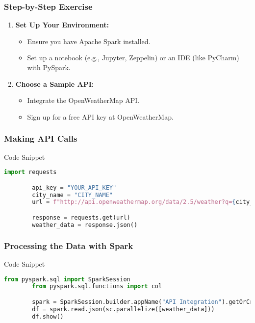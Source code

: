 \documentclass[aspectratio=169]{beamer}
\begin{document}
\begin{frame}[fragile]
    \frametitle{Step-by-Step Exercise}
    \begin{enumerate}
        \item \textbf{Set Up Your Environment:}
            \begin{itemize}
                \item Ensure you have Apache Spark installed.
                \item Set up a notebook (e.g., Jupyter, Zeppelin) or an IDE (like PyCharm) with PySpark.
            \end{itemize}
            
        \item \textbf{Choose a Sample API:}
            \begin{itemize}
                \item Integrate the OpenWeatherMap API.
                \item Sign up for a free API key at OpenWeatherMap.
            \end{itemize}
    \end{enumerate}
\end{frame}

\begin{frame}[fragile]
    \frametitle{Making API Calls}
    \begin{block}{Code Snippet}
        \begin{lstlisting}[language=Python]
        import requests

        api_key = "YOUR_API_KEY"
        city_name = "CITY_NAME"
        url = f"http://api.openweathermap.org/data/2.5/weather?q={city_name}&appid={api_key}"

        response = requests.get(url)
        weather_data = response.json()
        \end{lstlisting}
    \end{block}
\end{frame}

\begin{frame}[fragile]
    \frametitle{Processing the Data with Spark}
    \begin{block}{Code Snippet}
        \begin{lstlisting}[language=Python]
        from pyspark.sql import SparkSession
        from pyspark.sql.functions import col

        spark = SparkSession.builder.appName("API Integration").getOrCreate()
        df = spark.read.json(sc.parallelize([weather_data]))
        df.show()
        \end{lstlisting}
    \end{block}
\end{frame}
\end{document}
